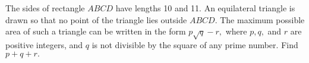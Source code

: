 The sides of rectangle $ABCD$ have lengths 10 and 11.  An equilateral triangle is drawn so that no point of the triangle lies outside $ABCD.$  The maximum possible area of such a triangle can be written in the form $p\sqrt{q}-r,$ where $p, q,$ and $r$ are positive integers, and $q$ is not divisible by the square of any prime number.  Find $p+q+r.$